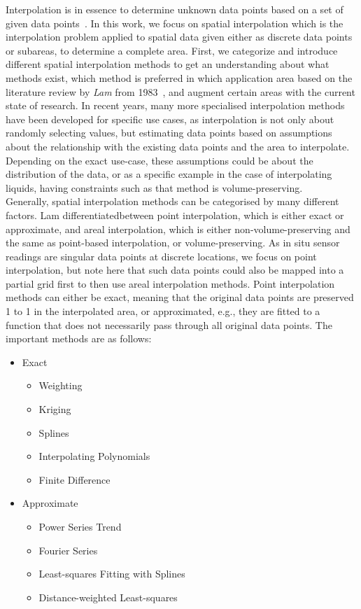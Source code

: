 Interpolation is in essence to determine unknown data points based on a set of given data points~\cite{steffensen1927interpolation}. In this work, we focus on spatial interpolation which is the interpolation problem applied to spatial data given either as discrete data points or subareas, to determine a complete area. First, we categorize and introduce different spatial interpolation methods to get an understanding about what methods exist, which method is preferred in which application area based on the literature review by \textit{Lam} from 1983~\cite{lam1983spatial}, and augment certain areas with the current state of research. In recent years, many more specialised interpolation methods have been developed for specific use cases, as interpolation is not only about randomly selecting values, but estimating data points based on assumptions about the relationship with the existing data points and the area to interpolate. Depending on the exact use-case, these assumptions could be about the distribution of the data, or as a specific example in the case of interpolating liquids, having constraints such as that method is volume-preserving.\\
Generally, spatial interpolation methods can be categorised by many different factors. Lam differentiatedbetween point interpolation, which is either exact or approximate, and areal interpolation, which is either non-volume-preserving and the same as point-based interpolation, or volume-preserving. As in situ sensor readings are singular data points at discrete locations, we focus on point interpolation, but note here that such data points could also be mapped into a partial grid first to then use areal interpolation methods.
Point interpolation methods can either be exact, meaning that the original data points are preserved 1 to 1 in the interpolated area, or approximated, e.g., they are fitted to a function that does not necessarily pass through all original data points. The important methods are as follows:

\begin{itemize}
    \item Exact

    \begin{itemize}
        \item Weighting
        \item Kriging
        \item Splines
        \item Interpolating Polynomials
        \item Finite Difference
    \end{itemize}

    \item Approximate

    \begin{itemize}
        \item Power Series Trend
        \item Fourier Series
        \item Least-squares Fitting with Splines
        \item Distance-weighted Least-squares
    \end{itemize}
\end{itemize}

